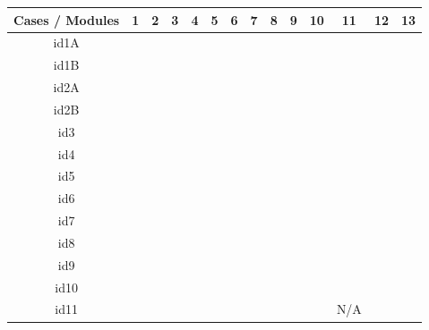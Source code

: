\documentclass[12pt, titlepage]{article}
\begin{document}
\begin{table}[!h]
	\begin{center}
		\begin{tabular}{| c | c | c | c | c | c | c | c | c | c | c | c | c | c |}
			\hline
			Cases / Modules & 1 & 2 & 3 & 4 & 5 & 6 & 7 & 8 & 9 & 10 & 11 & 12 & 13\\
			\hline
			id1A &\checkmark &\checkmark &\checkmark & & & & & & & & &\checkmark &\\
			\hline
			id1B &\checkmark &\checkmark & \checkmark& & & & & & & & & &\\
			\hline
			id2A &\checkmark & \checkmark&\checkmark & \checkmark& & & & & & & & \checkmark&\checkmark\\
			\hline
			id2B &\checkmark &\checkmark &\checkmark &\checkmark & & & & & & & &\checkmark &\checkmark\\
			\hline
			id3 &\checkmark &\checkmark &\checkmark & \checkmark & \checkmark& \checkmark&\checkmark & \checkmark& \checkmark&\checkmark & &\checkmark &\checkmark\\
			\hline
			id4 &\checkmark &\checkmark &\checkmark & \checkmark & \checkmark& \checkmark&\checkmark & \checkmark& \checkmark&\checkmark & &\checkmark &\checkmark\\
			\hline
			id5 &\checkmark &\checkmark &\checkmark & \checkmark & \checkmark& \checkmark&\checkmark & \checkmark& \checkmark&\checkmark & &\checkmark &\checkmark\\
			\hline
			id6 &\checkmark &\checkmark &\checkmark & \checkmark & \checkmark& \checkmark&\checkmark & \checkmark& \checkmark&\checkmark & &\checkmark &\checkmark\\
			\hline
			id7 &\checkmark &\checkmark &\checkmark & \checkmark & \checkmark& \checkmark&\checkmark & \checkmark& \checkmark&\checkmark & &\checkmark &\checkmark\\
			\hline
			id8 &\checkmark &\checkmark &\checkmark & \checkmark & \checkmark& \checkmark&\checkmark & \checkmark& \checkmark&\checkmark & &\checkmark &\checkmark\\
			\hline
			id9 &\checkmark &\checkmark &\checkmark & \checkmark & \checkmark& \checkmark&\checkmark & \checkmark& \checkmark&\checkmark & &\checkmark &\checkmark\\
			\hline
			id10 &\checkmark &\checkmark &\checkmark & \checkmark & \checkmark& \checkmark&\checkmark & \checkmark& \checkmark&\checkmark & &\checkmark &\checkmark\\
			\hline
			id11 &\checkmark &\checkmark &\checkmark & \checkmark & \checkmark& \checkmark&\checkmark & \checkmark& \checkmark&\checkmark & N/A &\checkmark &\checkmark\\

\end{tabular}
\end{center}
\end{table}
\end{document}

